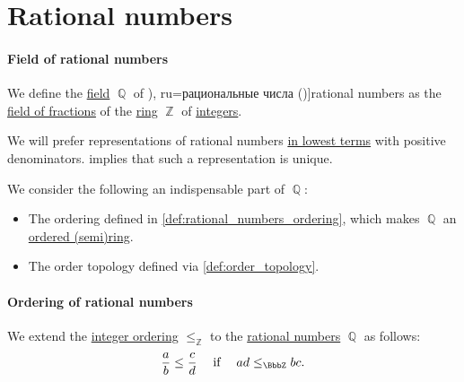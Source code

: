 \section{Rational numbers}\label{sec:rational_numbers}

\paragraph{Field of rational numbers}

\begin{definition}\label{def:rational_numbers}
  We define the \hyperref[def:field]{field} \( \BbbQ \) of \term[bg=рационални числа (\cite[18]{Тагамлицки1971ДиференциалноСмятане}), ru=рациональные числа (\cite[def. 22.1]{Проскуряков1951ТеоретическиеОсновыАрифметики})]{rational numbers} as the \hyperref[def:field_of_fractions]{field of fractions} of the \hyperref[def:ring]{ring} \( \BbbZ \) of \hyperref[def:integers]{integers}.
\end{definition}
\begin{comments}
  \item We will prefer representations of rational numbers \hyperref[def:lowest_terms]{in lowest terms} with positive denominators.  implies that such a representation is unique.

  \item We consider the following an indispensable part of \( \BbbQ \):
  \begin{itemize}
    \item The ordering defined in \cref{def:rational_numbers_ordering}, which makes \( \BbbQ \) an \hyperref[def:ordered_semiring]{ordered (semi)ring}.
    \item The order topology defined via \cref{def:order_topology}.
  \end{itemize}
\end{comments}

\paragraph{Ordering of rational numbers}

\begin{definition}\label{def:rational_numbers_ordering}
  We extend the \hyperref[def:integer_ordering]{integer ordering} \( \leq_\BbbZ \) to the \hyperref[def:rational_numbers]{rational numbers} \( \BbbQ \) as follows:
  \begin{equation*}
    \frac a b \leq \frac c d \quad\T{if}\quad ad \leq_\BbbZ bc.
  \end{equation*}
\end{definition}

